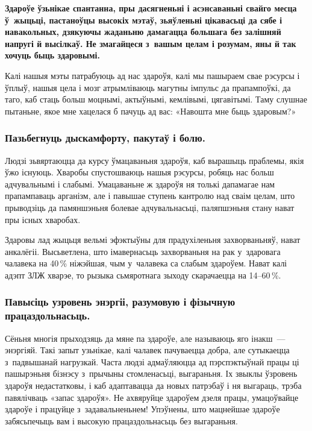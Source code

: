 \textbf{Здароўе ўзьнікае спантанна, пры дасягненьні і асэнсаваньні свайго месца ў~жыцьці, пастаноўцы высокіх мэтаў, зьяўленьні цікавасьці да сябе і навакольных, дзякуючы жаданьню дамагацца большага без залішняй напругі й высілкаў. Не змагайцеся з~вашым целам і розумам, яны й так хочуць быць здаровымі.}

Калі нашыя мэты патрабуюць ад нас здароўя, калі мы пашыраем свае рэсурсы і ўплыў, нашыя цела і мозг атрымліваюць магутны імпульс да прапампоўкі, да таго, каб стаць больш моцнымі, актыўнымі, кемлівымі, цягавітымі. Таму слушнае пытаньне, якое мне хацелася б пачуць ад вас: «Навошта мне быць здаровым?» 


\subsubsection{Пазьбегнуць дыскамфорту, пакутаў і болю.}

Людзі зьвяртаюцца да курсу ўмацаваньня здароўя, каб вырашыць праблемы, якія ўжо існуюць. Хваробы спустошваюць нашыя рэсурсы, робяць нас больш адчувальнымі і слабымі. Умацаваньне ж здароўя ня толькі дапамагае нам прапампаваць арганізм, але і павышае ступень кантролю над сваім целам, што прыводзіць да памяншэньня болевае адчувальнасьці, паляпшэньня стану нават пры існых хваробах.

Здаровы лад жыцьця вельмі эфэктыўны для прадухіленьня захворваньняў, нават анкалёгіі. Высьветлена, што імавернасьць захворваньня на рак у~здаровага чалавека на 40\,\% ніжэйшая, чым у~чалавека са слабым здароўем. Нават калі адэпт ЗЛЖ хварэе, то рызыка сьмяротнага зыходу скарачаецца на 14--60\,\%.

\subsubsection{Павысіць узровень энэргіі, разумовую і фізычную працаздольнасьць.} 
Сёньня многія прыходзяць да мяне па здароўе, але называюць яго інакш~--- энэргіяй. Такі запыт узьнікае, калі чалавек пачуваецца добра, але сутыкаецца з~падвышанай нагрузкай. Часта людзі адмаўляюцца ад пэрспэктыўнай працы ці пашырэньня бізнэсу з~прычыны стомленасьці, выгараньня. Іх звыклы ўзровень здароўя недастатковы, і каб адаптавацца да новых патрэбаў і ня выгараць, трэба павялічваць «запас здароўя». Не ахвяруйце здароўем дзеля працы, умацоўвайце здароўе і працуйце з~задавальненьнем! Упэўнены, што мацнейшае здароўе забясьпечыць вам і высокую працаздольнасьць без выгараньня.

